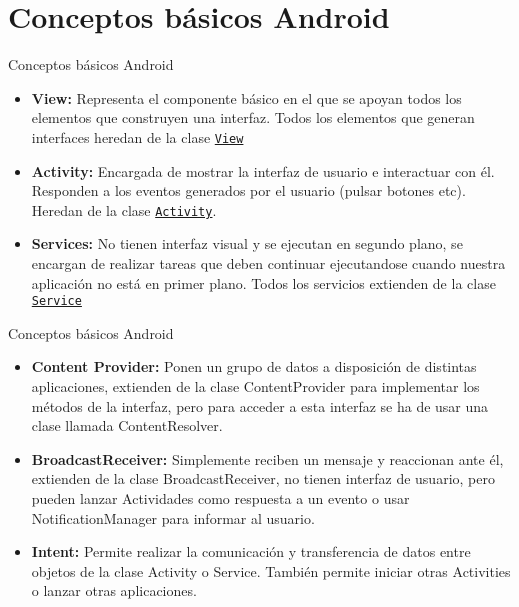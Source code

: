 \section{Conceptos básicos Android}

\begin{frame}{Conceptos básicos Android}
  \begin{itemize}
    \item {\textbf{View:} Representa el componente básico en el que se apoyan todos los elementos que construyen una interfaz. Todos los elementos que generan interfaces heredan de la clase \texttt{\href{http://developer.android.com/reference/android/view/View.html}{View}}
    \pause
    }

  \item<2-> {
    \textbf{Activity:} Encargada de mostrar la interfaz de usuario e interactuar con él. Responden a los eventos generados por el usuario (pulsar botones etc). Heredan de la clase \href{http://developer.android.com/reference/android/app/Activity.html}{\texttt{Activity}}.
  }
  \item<3-> { \textbf{Services:} No tienen interfaz visual y se ejecutan en segundo plano, se encargan de realizar tareas que deben continuar ejecutandose cuando nuestra aplicación no está en primer plano. Todos los servicios extienden de la clase \texttt{\href{http://developer.android.com/reference/android/app/Service.html}{Service}}
  }
  \end{itemize}
\end{frame}

\begin{frame}{Conceptos básicos Android}
  \begin{itemize}
  \item{
    \textbf{Content Provider:} Ponen un grupo de datos a disposición de distintas aplicaciones, extienden de la clase ContentProvider para implementar los métodos de la interfaz, pero para acceder a esta interfaz se ha de usar una clase llamada ContentResolver.
    \pause
  }
  \item<2-> {
    \textbf{BroadcastReceiver:} Simplemente reciben un mensaje y reaccionan ante él, extienden de la clase BroadcastReceiver, no tienen interfaz de usuario, pero pueden lanzar Actividades como respuesta a un evento o usar NotificationManager para informar al usuario.
  }
  \item<3-> {
    \textbf{Intent:} Permite realizar la comunicación y transferencia de datos entre objetos de la clase Activity o Service. También permite iniciar otras Activities o lanzar otras aplicaciones.
  }
  \end{itemize}
\end{frame}

